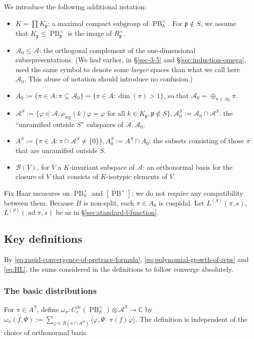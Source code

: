 \documentclass[reqno,10pt]{amsart}
\theoremstyle{plain} %
\theoremstyle{definition}
\theoremstyle{plain} %
\theoremstyle{remark}
\theoremstyle{itplain} %
\theoremstyle{remark} %
\renewcommand{\leq}{\leqslant}
\numberwithin{equation}{section}
\DeclareMathOperator{\ad}{ad}
\def\PB{\operatorname{PB}}
\DeclareMathOperator{\reg}{reg}
\begin{document}
We introduce the following additional notation:
\begin{itemize}
\item $K = \prod K_\mathfrak{p}$: a maximal compact subgroup of $\PB^\times_\mathbb{A}$.  For $\mathfrak{p} \notin S$, we assume that $K_\mathfrak{p} \leq \PB^\times_{\mathfrak{p}}$ is the image of $R_\mathfrak{p}^\times$.
\item $\mathcal{A}_0 \leq \mathcal{A}$: the orthogonal complement of the one-dimensional subrepresentations.  (We had earlier, in \S\ref{sec-3-5} and \S\ref{sec:induction-omega}, used the same symbol to denote some \emph{larger} spaces than what we call here $\mathcal{A}_0$.  This abuse of notation should introduce no confusion.)
\item $A_0 := \{\pi \in A : \pi \subseteq \mathcal{A}_0\} = \{\pi \in A : \dim(\pi) > 1\}$, so that $\mathcal{A}_0 = \oplus_{\pi \in A_0} \pi$.
\item $\mathcal{A}^S := \{\varphi \in \mathcal{A} : \rho_{\reg}(k) \varphi = \varphi \text{ for all } k \in K_\mathfrak{p}, \mathfrak{p} \notin S \}, \mathcal{A}_0^S := \mathcal{A}_0 \cap \mathcal{A}^S$: the ``unramified outside $S$'' subspaces of $\mathcal{A}, \mathcal{A}_0$.
\item $A^S := \{\pi \in A : \pi \cap \mathcal{A}^S \neq \{0\}\}, {A}_0^S := {A}^S \cap {A}_0$: the subsets consisting of those $\pi$ that are unramified outside $S$.
\item $\mathcal{B}(V)$, for $V$ a $K$-invariant subspace of $\mathcal{A}$: an orthonormal basis for the closure of $V$ that consists of $K$-isotypic elements of $V$.
  
\end{itemize}
Fix Haar measures on $\PB^\times_S$ and $[\PB^\times]$; we do not require any compatibility between them.  Because $B$ is non-split, each $\pi \in A_0$ is cuspidal.  Let $L^{(S)}(\pi,s)$, $L^{(S)}(\ad \pi,s)$ be as in \S\ref{sec:standard-l-function}.
\subsection{Key definitions\label{sec:main-general-estimate-key-defns}}
\label{sec-4-2}
By \eqref{eq:rapid-convergence-of-pretrace-formula}, \eqref{eq:polynomial-growth-of-reps} and \eqref{eq:HL}, the sums considered in the definitions to follow converge absolutely.

\subsubsection{The basic distributions}
\label{sec:omega-pi}
For $\pi \in A^S$, define $\omega_\pi : C_c^\infty(\PB^\times_S) \otimes \mathcal{A}^S \rightarrow \mathbb{C}$ by $\omega_\pi(f,\Psi) := \sum_{\varphi \in \mathcal{B}(\pi \cap \mathcal{A}^S)} \langle \varphi, \Psi \cdot \pi(f) \varphi \rangle$.
The definition is independent of the choice of orthonormal basis.
\end{document}
